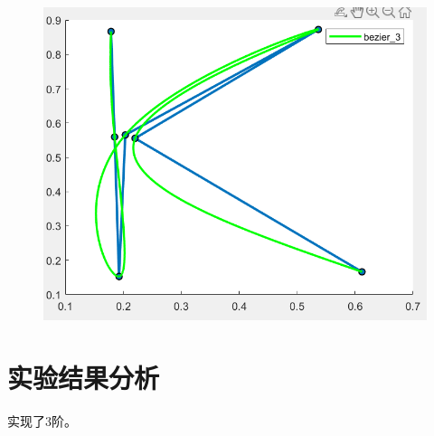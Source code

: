 \documentclass{article}
\newcommand{\Bezier}{B\'ezier}%
\begin{document}
	\begin{figure}[H]
		\centering
		\includegraphics{k}
		\caption{}
		\label{fig:k}
	\end{figure}
\section{实验结果分析}
	实现了3阶。

	
	
	
	
	
	
	
\end{document}
